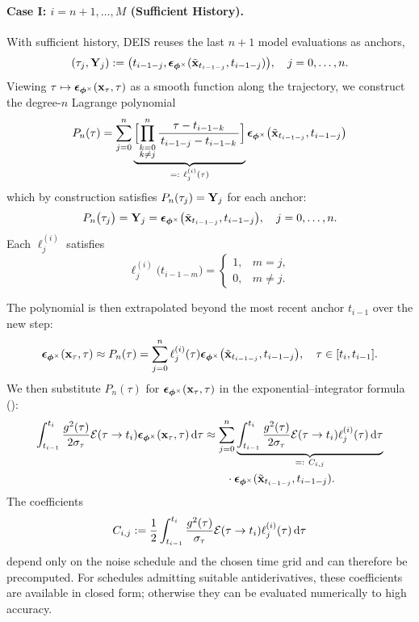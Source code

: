\paragraph{Case I: $i = n+1,\dots,M$ (Sufficient History).}
With sufficient history, DEIS reuses the last $n{+}1$ model evaluations as
anchors,
\[
(\tau_j,{\mathbf{Y}}_j) := \bigl(t_{i-1-j}, \bm{\epsilon}_{\bm{\phi}^\times}(\tilde{{\mathbf{x}}}_{t_{i-1-j}},t_{i-1-j})\bigr),
\quad j=0,\dots,n.
\]
Viewing
$\tau\mapsto\bm{\epsilon}_{\bm{\phi}^\times}({\mathbf{x}}_\tau,\tau)$
as a smooth function along the trajectory, we construct the degree-$n$
Lagrange polynomial
\[
P_n(\tau)
= 
\sum_{j=0}^{n}
\underbrace{\Bigl[\prod_{\substack{k=0\\k\neq j}}^{n}
\frac{\tau - t_{i-1-k}}{\,t_{i-1-j} - t_{i-1-k}\,}\Bigr]}_{=:~\ell_j^{(i)}(\tau)}
\bm{\epsilon}_{\bm{\phi}^\times}\bigl(\tilde{\mathbf x}_{t_{i-1-j}}, t_{i-1-j}\bigr)
\]
which by construction satisfies $P_n(\tau_j)={\mathbf{Y}}_j$ for each anchor:
\[
P_n\bigl(\tau_j\bigr)
= {\mathbf{Y}}_j =
\bm{\epsilon}_{\bm{\phi}^\times}\bigl(\tilde{\mathbf x}_{t_{i-1-j}}, t_{i-1-j}\bigr),
\quad
 j=0,\ldots,n.
\]
Each $\ell_j^{(i)}$ satisfies
\[
\ell_j^{(i)}\bigl(t_{i-1-m}\bigr)
=
\begin{cases}
1,&m=j,\\
0,&m\neq j.
\end{cases}
\]

The polynomial is then extrapolated beyond the most recent anchor
$t_{i-1}$ over the new step:
\[
\bm{\epsilon}_{\bm{\phi}^\times}({\mathbf{x}}_\tau,\tau) \approx
P_n(\tau)=\sum_{j=0}^{n}\ell_j^{(i)}(\tau) 
\bm{\epsilon}_{\bm{\phi}^\times}\bigl(\tilde{{\mathbf{x}}}_{t_{i-1-j}}, t_{i-1-j}\bigr), 
\quad \tau \in [t_i,t_{i-1}].
\]
We then substitute $P_n(\tau)$ for
${\bm{\epsilon}}_{\bm{\phi}^\times}({\mathbf{x}}_\tau,\tau)$ in the
exponential--integrator formula ():
\begin{align*}
\int_{t_{i-1}}^{t_i}
\frac{g^2(\tau)}{2\sigma_\tau}
\mathcal{E}(\tau\to t_i)
{\bm{\epsilon}}_{\bm{\phi}^\times}({\mathbf{x}}_\tau,\tau)\mathop{}\!\mathrm{d}\tau
&\approx
\sum_{j=0}^{n}
\underbrace{
\int_{t_{i-1}}^{t_i}
\frac{g^2(\tau)}{2\sigma_\tau}
\mathcal{E}(\tau\to t_i)
\ell_j^{(i)}(\tau)\mathop{}\!\mathrm{d}\tau
}_{=:~C_{i,j}}
\\
&\qquad\cdot
{\bm{\epsilon}}_{\bm{\phi}^\times}
(\tilde{{\mathbf{x}}}_{t_{i-1-j}},t_{i-1-j}).
\end{align*}
The coefficients
\[
C_{i,j}
:=
\frac{1}{2}
\int_{t_{i-1}}^{t_i}
\frac{g^2(\tau)}{\sigma_\tau}
\mathcal{E}(\tau\to t_i)
\ell_j^{(i)}(\tau)\mathop{}\!\mathrm{d}\tau
\]
depend only on the noise schedule and the chosen time grid and can therefore
be precomputed. For schedules admitting suitable antiderivatives, these
coefficients are available in closed form; otherwise they can be evaluated
numerically to high accuracy.

